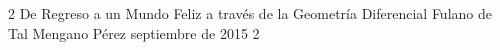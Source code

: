 \documentclass[letterpaper, 12pt]{thesisECS}
\begin{document}
\newcommand{\facultad}{Facultad de Ingeniería}
\newcommand{\escuela}{Escuela de Ciencias y Sistemas}
\newcommand{\tituloTesis}{De Regreso a un Mundo Feliz a través de la Geometría Diferencial}
%
\newcommand{\autor}{}
\newcommand{\asesor}{}
\newcommand{\pdftitle}{\tituloTesis}
\newcommand{\pdfkeywords}{}
\newcommand{\pdfauthor}{}
\newcommand{\pdfsubject}{}
\datosThesis
%
{2}%
{\tituloTesis}		%
{Fulano de Tal}%
{Mengano Pérez}%
{septiembre de 2015}		%
{2}							%







 














\end{document}
